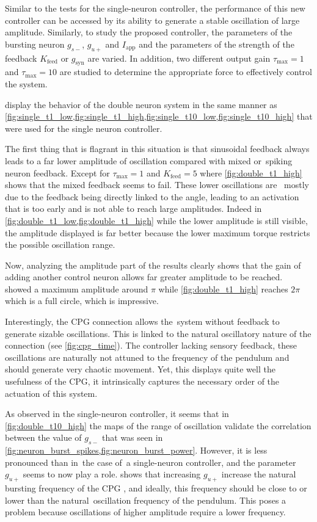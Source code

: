 Similar to the tests for the single-neuron controller, the performance of this new controller can be accessed by its ability to generate a stable oscillation of large amplitude.
Similarly, to study the proposed controller, the parameters of the bursting neuron $g_{s-}$, $g_{u+}$ and $I_\text{app}$ and the parameters of the strength of the feedback $K_\text{feed}$ or $g_\text{syn}$ are varied.
In addition, two different output gain $\tau_\text{max} = 1$ and $\tau_\text{max} = 10$ are studied to determine the appropriate force to effectively control the system.  %

 display the behavior of the double neuron system in the same manner as \cref{fig:single_t1_low,fig:single_t1_high,fig:single_t10_low,fig:single_t10_high} that were used for the single neuron controller.

The first thing that is flagrant in this situation is that sinusoidal feedback always leads to a far lower amplitude of oscillation compared with mixed or spiking neuron feedback.
Except for $\tau_\text{max}=1$ and $K_\text{feed} = 5$ where \cref{fig:double_t1_high} shows that the mixed feedback seems to fail.
These lower oscillations are  mostly due to the feedback being directly linked to the angle, leading to an activation that is too early and is not able to reach large amplitudes.
Indeed in \cref{fig:double_t1_low,fig:double_t1_high} while the lower amplitude is still visible, the amplitude displayed is far better because the lower maximum torque restricts the possible oscillation range.

Now, analyzing the amplitude part of the results clearly shows that the gain of adding another control neuron allows far greater amplitude to be reached. 
 showed a maximum amplitude around $\pi$ while \cref{fig:double_t1_high} reaches $2\pi$ which is a full circle, which is impressive.

Interestingly, the CPG connection allows the system without feedback to generate sizable oscillations.
This is linked to the natural oscillatory nature of the connection (see \cref{fig:cpg_time}).
The controller lacking sensory feedback, these oscillations are naturally not attuned to the frequency of the pendulum and should generate very chaotic movement.
Yet, this displays quite well the usefulness of the CPG, it intrinsically captures the necessary order of the actuation of this system.

As observed in the single-neuron controller, it seems that in \cref{fig:double_t10_high} the maps of the range of oscillation validate the correlation between the value of $g_{s-}$ that was seen in \cref{fig:neuron_burst_spikes,fig:neuron_burst_power}.
However, it is less pronounced than in the case of a single-neuron controller, and the parameter $g_{u+}$ seems to now play a role.
 shows that increasing $g_{u+}$ increase the natural bursting frequency of the CPG , and ideally, this frequency should be close to or lower than the natural oscillation frequency of the pendulum.
This poses a problem because oscillations of higher amplitude require a lower frequency.

